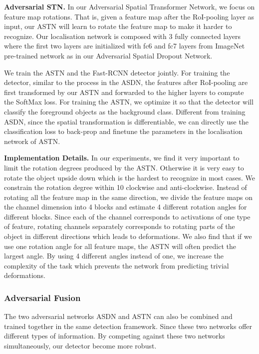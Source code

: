 \documentclass[10pt,twocolumn,letterpaper]{article}
\begin{document}
\textbf{Adversarial STN.} In our Adversarial Spatial Transformer Network, we focus on feature map rotations. That is, given a feature map after the RoI-pooling layer as input, our ASTN will learn to rotate the feature map to make it harder to recognize. Our localisation network is composed with 3 fully connected layers where the first two layers are initialized with fc6 and fc7 layers from ImageNet pre-trained network as in our Adversarial Spatial Dropout Network. 

We train the ASTN and the Fast-RCNN detector jointly. For training the detector, similar to the process in the ASDN, the features after RoI-pooling are first transformed by our ASTN and forwarded to the higher layers to compute the SoftMax loss. For training the ASTN, we optimize it so that the detector will classify the foreground objects as the background class. Different from training ASDN, since the spatial transformation is differentiable, we can directly use the classification loss to back-prop and finetune the parameters in the localisation network of ASTN. 

\textbf{Implementation Details.} In our experiments, we find it very important to limit the rotation degrees produced by the ASTN. Otherwise it is very easy to rotate the object upside down which is the hardest to recognize in most cases. We constrain the rotation degree within  10{\degree} clockwise and anti-clockwise. Instead of rotating all the feature map in the same direction, we divide the feature maps on the channel dimension into 4 blocks and estimate 4 different rotation angles for different blocks. Since each of the channel corresponds to activations of one type of feature, rotating channels separately corresponds to rotating parts of the object in different directions which leads to deformations. We also find that if we use one rotation angle for all feature maps, the ASTN will often predict the largest angle. By using 4 different angles instead of one, we increase the complexity of the task which prevents the network from predicting trivial deformations. 

\vspace{-0.1in}
\subsubsection{Adversarial Fusion}
\vspace{-0.05in}
The two adversarial networks ASDN and ASTN can also be combined and trained together in the same detection framework. Since these two networks offer different types of information. By competing against these two networks simultaneously, our detector become more robust. 
\end{document}
